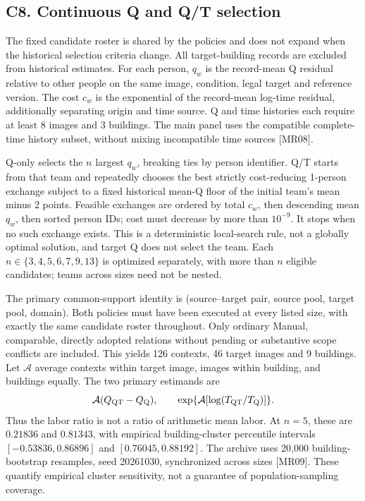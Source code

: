 \subsection*{C8. Continuous Q and Q/T selection}
The fixed candidate roster is shared by the policies and does not expand
when the historical selection criteria change.
All target-building records are excluded from historical estimates.
For each person, $q_w$ is the record-mean Q residual relative to other people
on the same image, condition, legal target and reference version.
The cost $c_w$ is the exponential of the record-mean log-time residual,
additionally separating origin and time source. Q and time histories
each require at least 8 images and 3 buildings.
The main panel uses the compatible complete-time history subset, without
mixing incompatible time sources [MR08].

Q-only selects the $n$ largest $q_w$, breaking ties by person identifier.
Q/T starts from that team and repeatedly chooses the best strictly
cost-reducing 1-person exchange subject to a fixed historical mean-Q
floor of the initial team's mean minus 2 points. Feasible exchanges are
ordered by total $c_w$, then descending mean $q_w$, then sorted person IDs;
cost must decrease by more than $10^{-9}$. It stops when no such exchange
exists. This is a deterministic local-search rule, not a globally optimal
solution, and target Q does not select the team. Each
$n\in\{3,4,5,6,7,9,13\}$ is optimized separately, with more than $n$
eligible candidates; teams across sizes need not be nested.

The primary common-support identity is
(source--target pair, source pool, target pool, domain).
Both policies must have been executed at every listed size, with exactly
the same candidate roster throughout. Only ordinary Manual, comparable,
directly adopted relations without pending or substantive scope conflicts
are included. This yields 126 contexts, 46 target images and 9 buildings.
Let $\mathcal A$ average contexts within target image, images within
building, and buildings equally. The two primary estimands are
\[
 \mathcal A(Q_{\rm QT}-Q_{\rm Q}),\qquad
 \exp\{\mathcal A[\log(T_{\rm QT}/T_{\rm Q})]\}.
\]
Thus the labor ratio is not a ratio of arithmetic mean labor.
At $n=5$, these are $0.21836$ and $0.81343$, with empirical
building-cluster percentile intervals $[-0.53836,0.86896]$ and
$[0.76045,0.88192]$. The archive uses 20,000 building-bootstrap
resamples, seed 20261030, synchronized across sizes [MR09].
These quantify empirical cluster sensitivity, not a guarantee of
population-sampling coverage.

